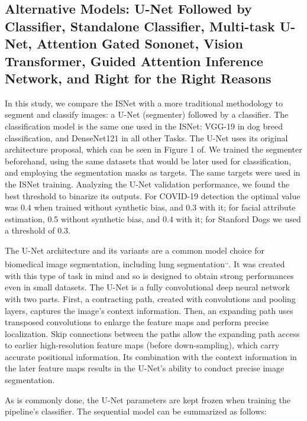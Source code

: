 \documentclass[fleqn,10pt]{wlscirep}
\begin{document}
{\subsection{Alternative Models: U-Net Followed by Classifier, Standalone Classifier, Multi-task U-Net, Attention Gated Sononet, Vision Transformer, Guided Attention Inference Network, and Right for the Right Reasons}
\label{BaselineImplementations}


In this study, we compare the ISNet with a more traditional methodology to segment and classify images: a U-Net (segmenter) followed by a classifier. The classification model is the same one used in the ISNet: VGG-19 in dog breed classification, and DenseNet121 in all other Tasks. The U-Net uses its original architecture proposal, which can be seen in Figure 1 of\cite{unet}. We trained the segmenter beforehand, using the same datasets that would be later used for classification, and employing the segmentation masks as targets. The same targets were used in the ISNet training. Analyzing the U-Net validation performance, we found the best threshold to binarize its outputs. For COVID-19 detection the optimal value was 0.4 when trained without synthetic bias, and 0.3 with it; for facial attribute estimation, 0.5 without synthetic bias, and 0.4 with it; for Stanford Dogs we used a threshold of 0.3.

The U-Net architecture\cite{unet} and its variants are a common model choice for biomedical image segmentation, including lung segmentation\cite{bassi2021covid19}\textsuperscript{,}\cite{covidSegmentation}\textsuperscript{,}\cite{TuberculosisUNet}. It was created with this type of task in mind and so is designed to obtain strong performances even in small datasets. The U-Net is a fully convolutional deep neural network with two parts. First, a contracting path, created with convolutions and pooling layers, captures the image's context information. Then, an expanding path uses transposed convolutions to enlarge the feature maps and perform precise localization. Skip connections between the paths allow the expanding path access to earlier high-resolution feature maps (before down-sampling), which carry accurate positional information. Its combination with the context information in the later feature maps results in the U-Net's ability to conduct precise image segmentation.

As is commonly done, the U-Net parameters are kept frozen when training the pipeline's classifier. The sequential model can be summarized as follows:

}
\end{document}
